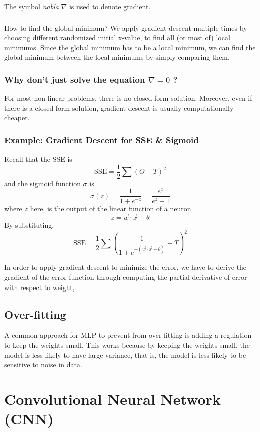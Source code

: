 \documentclass{note}
\begin{document}
The symbol \textit{nabla} $\nabla$ is used to denote gradient.

\subsubsection{}{How to find the global minimum?}
We apply gradient descent multiple times by choosing different randomized initial x-value, to find all (or most of) local minimums. Since the global minimum has to be a local minimum, we can find the global minimum between the local minimums by simply comparing them.

\subsubsection{Why don't just solve the equation $\nabla = 0$ ?}
For most non-linear problems, there is no closed-form solution. Moreover, even if there is a closed-form solution, gradient descent is usually computationally cheaper.

\subsubsection{Example: Gradient Descent for SSE \& Sigmoid}

Recall that the SSE is
$$
\text{SSE} = \frac{1}{2} \sum (O - T)^2
$$
and the sigmoid function $\sigma$ is
$$
\sigma(z) = \frac{1}{1+e^{-z}} = \frac{e^x}{e^z + 1}
$$
where $z$ here, is the output of the linear function of a neuron
$$
z = \vec{w} \cdot \vec{x} + \theta
$$
By substituting, 
$$
\text{SSE} = \frac{1}{2} \sum (\frac{1}{1+e^{-(\vec{w} \cdot \vec{x} + \theta)}} - T)^2
$$

In order to apply gradient descent to minimize the error, we have to derive the gradient of the error function through computing the partial derivative of error with respect to weight, 

\subsection{Over-fitting}

A common approach for MLP to prevent from over-fitting is adding a regulation to keep the weights small. This works because by keeping the weights small, the model is less likely to have large variance, that is, the model is less likely to be sensitive to noise in data.

\section{Convolutional Neural Network (CNN)}
\end{document}
